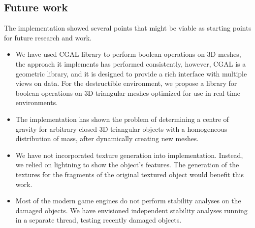 \subsection*{Future work}
The implementation showed several points that might be viable as starting points for future research and work.
\begin{itemize}
\item We have used CGAL library to perform boolean operations on 3D meshes, the approach it implements has performed consistently, however, CGAL is a geometric library, and it is designed to provide a rich interface with multiple views on data. For the destructible environment, we propose a library for boolean operations on 3D triangular meshes optimized for use in real-time environments.
\item The implementation has shown the problem of determining a centre of gravity for arbitrary closed 3D triangular objects with a homogeneous distribution of mass, after dynamically creating new meshes.
\item We have not incorporated texture generation into implementation. Instead, we relied on lightning to show the object's features. The generation of the textures for the fragments of the original textured object would benefit this work.
\item Most of the modern game engines do not perform stability analyses on the damaged objects. We have envisioned independent stability analyses running in a separate thread, testing recently damaged objects.
\end{itemize}

